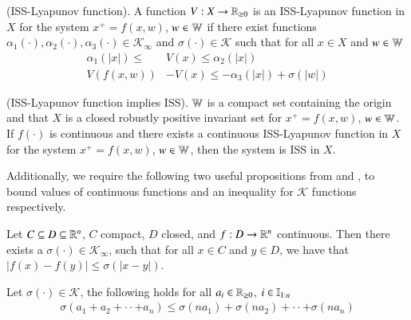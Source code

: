 \documentclass[preprint,5p, twocolumn, authoryear]{elsarticle}
\begin{document}
\begin{definition} \label{def:iss_lyapunov_func}
(ISS-Lyapunov function). A function $V : X \rightarrow \mathbb{R}_{\geq 0}$
is an ISS-Lyapunov function in $X$ for the system $x^+ = f(x, w)$, $w \in \mathbb{W}$
if there exist functions $\alpha_1(\cdot), \alpha_2(\cdot), \alpha_3(\cdot) 
\in \mathcal{K}_{\infty}$ and $\sigma(\cdot) \in \mathcal{K}$
such that for all $x \in X$ and $w \in \mathbb{W}$
\begin{align*}
    \alpha_1(\vert x \vert) \leq & V(x) \leq \alpha_2(\vert x \vert) \\
    V(f(x, w)) &- V(x) \leq -\alpha_3(\vert x \vert) + \sigma(\vert w \vert)
\end{align*}
\end{definition}

\begin{prop} \label{prop:lyapunov_implies_iss}
(ISS-Lyapunov function implies ISS). $\mathbb{W}$ is a compact
set containing the origin and that $X$ is a closed robustly
positive invariant set for $x^+ = f(x, w)$, $w \in \mathbb{W}$. If 
$f(\cdot)$ is continuous and there exists a continuous 
ISS-Lyapunov function in $X$ for the system $x^+ = f(x, w)$, $w \in \mathbb{W}$, 
then the system is ISS in $X$.
\end{prop}

Additionally, we require the following two 
useful propositions from 
\cite*{allan:bates:risbeck:rawlings:2017} and 
\cite*{rawlings:ji:2012},
to bound values of continuous functions and an
inequality for $\mathcal{K}$ functions respectively.

\begin{prop} \label{prop:continuous_funcs}
    Let $C \subseteq D \subseteq \mathbb{R}^n$, $C$ compact, 
    $D$ closed, and $f : D \rightarrow \mathbb{R}^n$ continuous.  
    Then there exists a $\sigma(\cdot) \in \mathcal{K}_{\infty}$,
    such that for all $x \in C$ and $y \in D$, we have that 
    $\vert f(x) - f(y) \vert \leq \sigma(\vert x-y \vert)$.
\end{prop}
    
\begin{prop} \label{prop:Kfunction_inequality}
    Let $\sigma(\cdot) \in \mathcal{K}$, the following holds 
    for all $a_i \in \mathbb{R}_{\geq 0}$, $i \in \mathbb{I}_{1:n}$ 
    \begin{align*}
        \sigma(a_1 + a_2 + \cdot \cdot + a_n) \leq \sigma(na_1) + 
        \sigma(na_2) + \cdot \cdot + \sigma(na_n)
    \end{align*}    
\end{prop}
\end{document}
